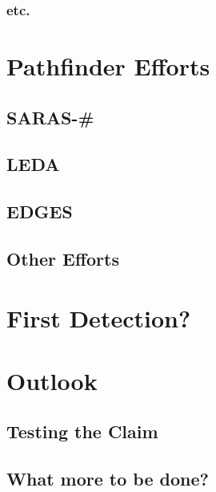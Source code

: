 \subsubsection{etc.}

\section{Pathfinder Efforts}

\subsection{SARAS-\#}

\subsection{LEDA}

\subsection{EDGES}

\subsection{Other Efforts}


\section{First Detection?}

\section{Outlook}
\subsection{Testing the Claim}
\subsection{What more to be done?}






